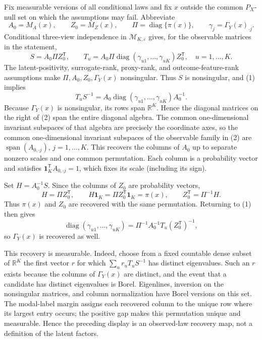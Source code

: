 Fix measurable versions of all conditional laws and fix \(x\) outside the common \(P_X\)-null set on which the assumptions may fail.  Abbreviate
\[
A_0=M_A(x),\qquad Z_0=M_Z(x),\qquad \Pi=\operatorname{diag}\{\pi(x)\},
\qquad \gamma_j=\Gamma_Y(x)_{\cdot j}.
\]
Conditional three-view independence in \(\mathcal M_{K,\varepsilon}\) gives, for the observable matrices in the statement,
\[
S=A_0\Pi Z_0^{\mathsf T},\qquad
T_u=A_0\Pi\operatorname{diag}(\gamma_{u1},\ldots,\gamma_{uK})Z_0^{\mathsf T},
\quad u=1,\ldots,K. \tag{1}
\]
The latent-positivity, surrogate-rank, proxy-rank, and outcome-feature-rank assumptions make \(\Pi,A_0,Z_0,\Gamma_Y(x)\) nonsingular.  Thus \(S\) is nonsingular, and (1) implies
\[
T_uS^{-1}=A_0\operatorname{diag}(\gamma_{u1},\ldots,\gamma_{uK})A_0^{-1}. \tag{2}
\]
Because \(\Gamma_Y(x)\) is nonsingular, its rows span \(\mathbb R^K\).  Hence the diagonal matrices on the right of (2) span the entire diagonal algebra.  The common one-dimensional invariant subspaces of that algebra are precisely the coordinate axes, so the common one-dimensional invariant subspaces of the observable family in (2) are
\(\operatorname{span}(A_{0,\cdot j})\), \(j=1,\ldots,K\).  This recovers the columns of \(A_0\) up to separate nonzero scales and one common permutation.  Each column is a probability vector and satisfies \(\mathbf 1_K^{\mathsf T}A_{0,\cdot j}=1\), which fixes its scale (including its sign).

Set \(H=A_0^{-1}S\).  Since the columns of \(Z_0\) are probability vectors,
\[
H=\Pi Z_0^{\mathsf T},\qquad
H\mathbf 1_K=\Pi Z_0^{\mathsf T}\mathbf 1_K=\pi(x),\qquad
Z_0^{\mathsf T}=\Pi^{-1}H. \tag{3}
\]
Thus \(\pi(x)\) and \(Z_0\) are recovered with the same permutation.  Returning to (1) then gives
\[
\operatorname{diag}(\gamma_{u1},\ldots,\gamma_{uK})
=\Pi^{-1}A_0^{-1}T_u(Z_0^{\mathsf T})^{-1}, \tag{4}
\]
so \(\Gamma_Y(x)\) is recovered as well.

This recovery is measurable.  Indeed, choose from a fixed countable dense subset of \(\mathbb R^K\) the first vector \(r\) for which \(\sum_u r_uT_uS^{-1}\) has distinct eigenvalues.  Such an \(r\) exists because the columns of \(\Gamma_Y(x)\) are distinct, and the event that a candidate has distinct eigenvalues is Borel.  Eigenlines, inversion on the nonsingular matrices, and column normalization have Borel versions on this set.  The modal-label margin assigns each recovered column to the unique row where its largest entry occurs; the positive gap makes this permutation unique and measurable.  Hence the preceding display is an observed-law recovery map, not a definition of the latent factors.

